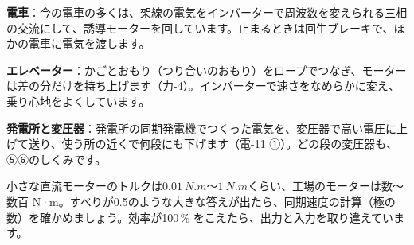 \begin{phkougaku}[電気機器が支えるもの]
\textbf{電車}：今の電車の多くは、架線の電気をインバーターで周波数を変えられる三相の交流にして、誘導モーターを回しています。止まるときは回生ブレーキで、ほかの電車に電気を渡します。

\textbf{エレベーター}：かごとおもり（つり合いのおもり）をロープでつなぎ、モーターは差の分だけを持ち上げます（力-4）。インバーターで速さをなめらかに変え、乗り心地をよくしています。

\textbf{発電所と変圧器}：発電所の同期発電機でつくった電気を、変圧器で高い電圧に上げて送り、使う所の近くで何段にも下げます（電-11 ①）。どの段の変圧器も、⑤⑥のしくみです。

\begin{phketa}[電気機器の数の目安]
小さな直流モーターのトルクは$\qty{0.01}{N.m}$〜$\qty{1}{N.m}$くらい、工場のモーターは数〜数百 N·m。すべりが0.5のような大きな答えが出たら、同期速度の計算（極の数）を確かめましょう。効率が100\,\% をこえたら、出力と入力を取り違えています。
\end{phketa}
\end{phkougaku}

